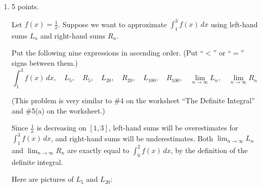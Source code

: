 \documentclass{article}
\begin{document}
\begin{enumerate}

\item 

\begin{grading}
    5 points.
\end{grading}

Let $f(x) = \displaystyle \frac{1}{x}$.  Suppose we want to
  approximate $\displaystyle \int_1^3 f(x)\,dx$ using left-hand sums $L_n$
  and right-hand sums $R_n$.

    \begin{problem}[\vfill]
      Put the following nine expressions in ascending order.  (Put ``$<$'' or
      ``$=$'' signs between them.)
      \[ 
      \int_1^3 f(x) \, dx, \quad L_5, \quad R_5, \quad L_{20}, \quad
      R_{20}, \quad L_{100}, \quad R_{100}, \quad \lim_{n \to \infty} L_n,
      \quad \lim_{n \to \infty} R_n\]
    \end{problem}

    \begin{solution}
      (This problem is very similar to
          {{{{\#4}} on {the worksheet ``The Definite Integral''}}} and
          {{{{\#5}}(a)}} on the worksheet.)

      Since $\frac{1}{x}$ is decreasing on $[1, 3]$, left-hand sums
      will be overestimates for $\displaystyle \int_1^3 f(x)\,dx$, and
      right-hand sums will be underestimates.  Both $\displaystyle \lim_{n
        \to \infty} L_n$ and $\displaystyle \lim_{n \to \infty} R_n$ are
      exactly equal to $\displaystyle \int_0^2 f(x)\,dx$, by the
      definition of the definite integral. 

      Here are pictures of $L_5$ and $L_{20}$:
      \begin{center}


\end{center}
\end{solution}
\end{enumerate}
\end{document}
